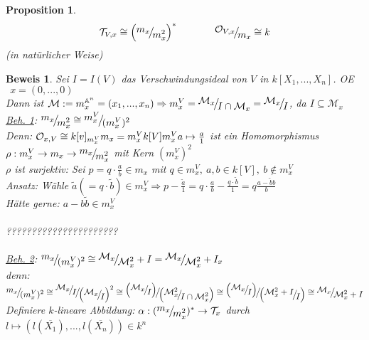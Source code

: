 \documentclass[a4paper,12pt]{report}
\theoremstyle{break}
\newtheorem{Prop}[Def]{Proposition}
\theoremstyle{nonumberbreak}
\theoremstyle{nonumberplain}
\newtheorem{Bew}{Beweis}
\newcommand{\FakRaum}[2]{
  \raisebox{0.7ex}{\ensuremath{#1}}
  \ensuremath{\mkern-3mu}\big/\ensuremath{\mkern-3mu}
  \raisebox{-0.6ex}{\ensuremath{#2}}}
\renewcommand{\OE}{O\!\!E~}
\begin{document}
\begin{Prop}
\label{prop:16.3}
$$\mathcal T_{V,x}\cong \left(\FakRaum{m_x}{m_x^2}\right)^*~~~~~~~~~~~\FakRaum{\mathcal O_{V,x}}{m_x}\cong k$$
(in natürlicher Weise)
\end{Prop}
\begin{Bew}
Sei $I=I(V)$ das Verschwindungsideal von $V$ in $k[X_1,...,X_n]$. \OE $~~x=(0,...,0)$\\
Dann ist $\mathcal M:=m_x^{\mathbb A^n}=(x_1,...,x_n)\\
\Rightarrow m_x^V=\FakRaum{\mathcal M_x}{I\cap\mathcal M_x}=\FakRaum{\mathcal M_x}{I}$, da $I\subseteq \mathcal M_x$\\
\underline{Beh. 1}:
$\FakRaum{m_x}{m_x^2}\cong\FakRaum{m_x^V}{(m_x^V)^2}$\\
Denn: $\mathcal O_{x,V}\cong k[v]_{m_x^V}\\
m_x=m_x^V k[V] m_x^V\\
a\mapsto \frac{a}{1}$ ist ein Homomorphismus $\rho: m_x^V\rightarrow m_x\rightarrow \FakRaum{m_x}{m_x^2}$ mit Kern $(m_x^V)^2$\\
$\rho$ ist surjektiv: Sei $p=q\cdot\frac{a}{b}\in m_x$ mit $q\in m_x^V,~a,b\in k[V],~b\notin m_x^V$\\
Ansatz: Wähle $\tilde{a}(=q\cdot \tilde{b})\in m_x^V\Rightarrow p-\frac{\tilde{a}}{1}= q\cdot \frac{a}{b}-\frac{q\cdot\tilde{b}}{1}=q\frac{a-\tilde{b}b}{b}$\\
Hätte gerne: $a-b\tilde{b}\in m_x^V$
\\\\??????????????????????\\\\
\underline{Beh. 2}:
$\FakRaum{m_x}{(m_x^V)^2}\cong\FakRaum{\mathcal M_x}{\mathcal M_x^2}+I=\FakRaum{\mathcal M_x}{\mathcal M_x^2}+I_x$\\
denn: $\FakRaum{m_x}{(m_x^V)^2}\cong\FakRaum{\FakRaum{\mathcal M_x}{I}}{\left(\FakRaum{\mathcal M_x}{I}\right)^2}\\
\cong\FakRaum{\left(\FakRaum{\mathcal M_x}{I}\right)}{\left(\FakRaum{\mathcal M_x^2}{I\cap\mathcal M_x^2}\right)}\\
\cong \FakRaum{\left(\FakRaum{\mathcal M_x}{I}\right)}{\left(\FakRaum{\mathcal M_x^2+I}{I}\right)}\\
\cong \FakRaum{\mathcal M_x}{\mathcal M_x^2+I}$\\
Definiere $k$-lineare Abbildung: $\alpha: (\FakRaum{m_x}{m_x^2})^*\rightarrow \mathcal T_x$ durch $l\mapsto (l(\overline{X_1}),...,l(\overline{X_n}))\in k^n$\\

\end{Bew}
\end{document}
